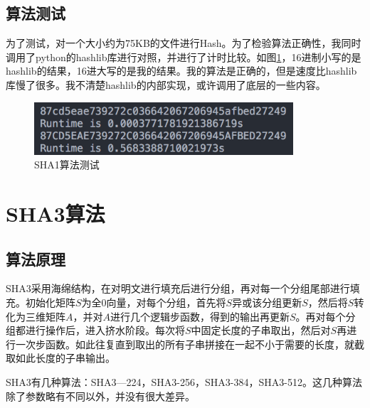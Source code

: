 \documentclass[11pt]{ctexart}
\begin{document}
\subsection{算法测试} %
为了测试，对一个大小约为75KB的文件进行Hash。为了检验算法正确性，我同时调用了python的hashlib库进行对照，并进行了计时比较。如图\ref{img_sha1}，16进制小写的是hashlib的结果，16进大写的是我的结果。我的算法是正确的，但是速度比hashlib库慢了很多。我不清楚hashlib的内部实现，或许调用了底层的一些内容。
\begin{figure}[htbp]
\centering
\includegraphics[width=9.62cm, height=1.96cm]{sha1.png}
\caption{SHA1算法测试}
\label{img_sha1}
\end{figure}
\section{SHA3算法} %
\subsection{算法原理} %
SHA3采用海绵结构，在对明文进行填充后进行分组，再对每一个分组尾部进行填充。初始化矩阵$S$为全0向量，对每个分组，首先将$S$异或该分组更新$S$，然后将$S$转化为三维矩阵$A$，并对$A$进行几个逻辑步函数，得到的输出再更新$S$。再对每个分组都进行操作后，进入挤水阶段。每次将$S$中固定长度的子串取出，然后对$S$再进行一次步函数。如此往复直到取出的所有子串拼接在一起不小于需要的长度，就截取如此长度的子串输出。

SHA3有几种算法：SHA3—224，SHA3-256，SHA3-384，SHA3-512。这几种算法除了参数略有不同以外，并没有很大差异。
\end{document}
